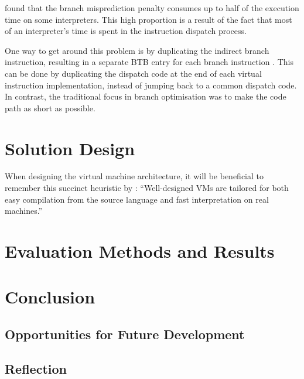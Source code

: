 		\cite{structureinterpreters} found that the branch misprediction penalty consumes up to half of the execution time on some interpreters. This high proportion is a result of the fact that most of an interpreter's time is spent in the instruction dispatch process.
		
		One way to get around this problem is by duplicating the indirect branch instruction, resulting in a separate BTB entry for each branch instruction \citep{fastjava}. This can be done by duplicating the dispatch code at the end of each virtual instruction implementation, instead of jumping back to a common dispatch code. In contrast, the traditional focus in branch optimisation was to make the code path as short as possible.
		
\chapter{Solution Design}
	When designing the virtual machine architecture, it will be beneficial to remember this succinct heuristic by \cite{structureinterpreters}: ``Well-designed VMs are tailored for both easy compilation from the source language and fast interpretation on real machines.''

\chapter{Evaluation Methods and Results}

\chapter{Conclusion}
	
	\section{Opportunities for Future Development}
	
	\section{Reflection}

\bibliographysection

